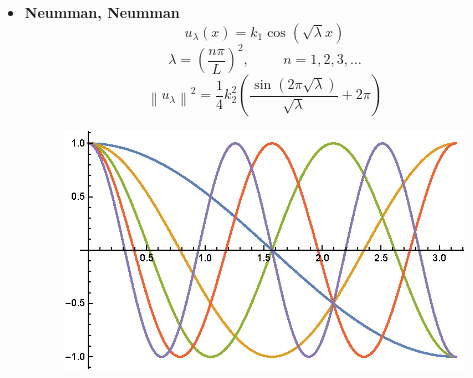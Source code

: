 \documentclass[10pt,a4paper]{article}
\newcommand{\prt}[1]{\left(#1\right)}
\newcommand{\norm}[1]{\left\lVert#1\right\rVert}
\begin{document}
\begin{itemize}
	\item \textbf{Neumman, Neumman}
		\[u_\lambda(x)=k_1\cos{\prt{\sqrt{\lambda}x}}\]
		\[\lambda = \prt{\frac{n\pi}{L}}^2, \hspace{1cm}n=1,2,3,\dots\]
		\[\norm{u_\lambda}^2 =\frac{1}{4} k_2^2 \left(\frac{\sin \left(2 \pi  \sqrt{\lambda }\right)}{\sqrt{\lambda }}+2 \pi \right)\]
	\begin{figure}[h!]
    \centering
      \includegraphics[scale=1]{figures/nn.eps}
	\end{figure}	
\end{itemize}
\end{document}
